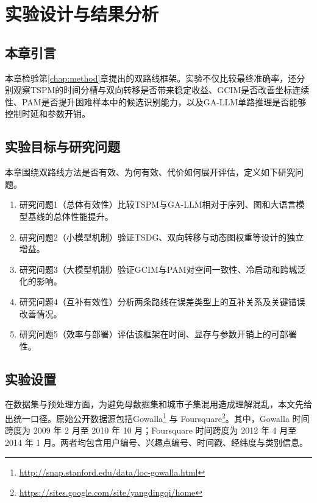 \chapter{实验设计与结果分析}
\label{chap:exp}

\section{本章引言}
本章检验第\ref{chap:method}章提出的双路线框架。实验不仅比较最终准确率，还分别观察TSPM的时间分槽与双向转移是否带来稳定收益、GCIM是否改善坐标连续性、PAM是否提升困难样本中的候选识别能力，以及GA-LLM单路推理是否能够控制时延和参数开销。

\section{实验目标与研究问题}
本章围绕双路线方法是否有效、为何有效、代价如何展开评估，定义如下研究问题。
\begin{enumerate}
    \item {\heiti{}研究问题1（总体有效性）}比较TSPM与GA-LLM相对于序列、图和大语言模型基线的总体性能提升。
    \item {\heiti{}研究问题2（小模型机制）}验证TSDG、双向转移与动态图权重等设计的独立增益。
    \item {\heiti{}研究问题3（大模型机制）}验证GCIM与PAM对空间一致性、冷启动和跨城泛化的影响。
    \item {\heiti{}研究问题4（互补有效性）}分析两条路线在误差类型上的互补关系及关键错误改善情况。
    \item {\heiti{}研究问题5（效率与部署）}评估该框架在时间、显存与参数开销上的可部署性。
\end{enumerate}

\section{实验设置}
在数据集与预处理方面，为避免母数据集和城市子集混用造成理解混乱，本文先给出统一口径。原始公开数据源包括Gowalla\footnote{\url{http://snap.stanford.edu/data/loc-gowalla.html}} 与 Foursquare\footnote{\url{https://sites.google.com/site/yangdingqi/home}}。其中，Gowalla 时间跨度为 2009 年 2 月至 2010 年 10 月；Foursquare 时间跨度为 2012 年 4 月至 2014 年 1 月。两者均包含用户编号、兴趣点编号、时间戳、经纬度与类别信息。

